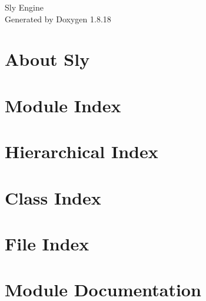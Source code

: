 \let\mypdfximage\pdfximage\def\pdfximage{\immediate\mypdfximage}\documentclass[twoside]{book}
\newcommand{\+}{\discretionary{\mbox{\scriptsize$\hookleftarrow$}}{}{}}
\newcommand{\clearemptydoublepage}{%
  \newpage{\pagestyle{empty}\cleardoublepage}%
}
\begin{document}
\hypersetup{pageanchor=false,
             bookmarksnumbered=true,
             pdfencoding=unicode
            }
\begin{titlepage}
\vspace*{7cm}
\begin{center}%
{\Large Sly Engine }\\
\vspace*{1cm}
{\large Generated by Doxygen 1.8.18}\\
\end{center}
\end{titlepage}
\clearemptydoublepage
{}
\tableofcontents
\clearemptydoublepage
{}
\hypersetup{pageanchor=true}

\chapter{About Sly}
\label{index}\hypertarget{index}{}
\chapter{Module Index}

\chapter{Hierarchical Index}

\chapter{Class Index}

\chapter{File Index}

\chapter{Module Documentation}















\end{document}
